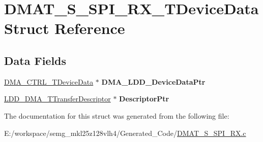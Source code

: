 \hypertarget{struct_d_m_a_t___s___s_p_i___r_x___t_device_data}{\section{D\-M\-A\-T\-\_\-\-S\-\_\-\-S\-P\-I\-\_\-\-R\-X\-\_\-\-T\-Device\-Data Struct Reference}
\label{struct_d_m_a_t___s___s_p_i___r_x___t_device_data}
}
\subsection*{Data Fields}
\begin{DoxyCompactItemize}
\item 
\hypertarget{struct_d_m_a_t___s___s_p_i___r_x___t_device_data_a73970757cf13b41b62e24e7ff9ad0e6e}{\hyperlink{struct_d_m_a___c_t_r_l___t_device_data}{D\-M\-A\-\_\-\-C\-T\-R\-L\-\_\-\-T\-Device\-Data} $\ast$ {\bfseries D\-M\-A\-\_\-\-L\-D\-D\-\_\-\-Device\-Data\-Ptr}}\label{struct_d_m_a_t___s___s_p_i___r_x___t_device_data_a73970757cf13b41b62e24e7ff9ad0e6e}

\item 
\hypertarget{struct_d_m_a_t___s___s_p_i___r_x___t_device_data_a4e67ad07218894e08846f71d60017297}{\hyperlink{struct_l_d_d___d_m_a___t_transfer_descriptor}{L\-D\-D\-\_\-\-D\-M\-A\-\_\-\-T\-Transfer\-Descriptor} $\ast$ {\bfseries Descriptor\-Ptr}}\label{struct_d_m_a_t___s___s_p_i___r_x___t_device_data_a4e67ad07218894e08846f71d60017297}

\end{DoxyCompactItemize}


The documentation for this struct was generated from the following file\-:\begin{DoxyCompactItemize}
\item 
E\-:/workspace/semg\-\_\-mkl25z128vlh4/\-Generated\-\_\-\-Code/\hyperlink{_d_m_a_t___s___s_p_i___r_x_8c}{D\-M\-A\-T\-\_\-\-S\-\_\-\-S\-P\-I\-\_\-\-R\-X.\-c}\end{DoxyCompactItemize}
